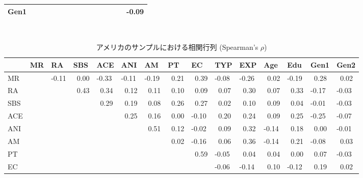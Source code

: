 \documentclass[a4j,12pt]{jreport}
\begin{document}
\begin{table}[H]
{\begin{threeparttable}
\begin{tabular}{@{}lllllllllllllll@{}}
Gen1 &    &       &            &            &            &            &            &            &       &            &            &            &            & -0.09       
\\ \bottomrule
\end{tabular}
  \begin{tablenotes}
      \small
      \item ~~
    \end{tablenotes}
  \end{threeparttable}
  }
\end{table}

\begin{table}[H]
{\scriptsize
  \begin{threeparttable}
\caption{アメリカのサンプルにおける相関行列 (Spearman's $\rho$) }
\label{tab:Table_Cor_US}
\begin{tabular}{@{}lllllllllllllll@{}}
\toprule
     & MR & RA    & SBS        & ACE        & ANI        & AM         & PT         & EC         & TYP        & EXP        & Age        & Edu        & Gen1       & Gen2       \\ \midrule
MR   &    & -0.11 & ~0.00 & -0.33      & -0.11      & -0.19      & ~0.21 & ~0.39 & -0.08      & -0.26      & ~0.02 & -0.19      & ~0.28 & ~0.02 \\
RA   &    &       & ~0.43 & ~0.34 & ~0.12 & ~0.11 & ~0.10 & ~0.09 & ~0.07 & ~0.30 & ~0.07 & ~0.33 & -0.17      & -0.03      \\
SBS  &    &       &            & ~0.29 & ~0.19 & ~0.08 & ~0.26 & ~0.27 & ~0.02 & ~0.10 & ~0.09 & ~0.04 & -0.01      & -0.03      \\
ACE  &    &       &            &            & ~0.25 & ~0.16 & ~0.00 & -0.10      & ~0.20 & ~0.24 & ~0.09 & ~0.25 & -0.25      & -0.07      \\
ANI  &    &       &            &            &            & ~0.51 & ~0.12 & -0.02      & ~0.09 & ~0.32 & -0.14      & ~0.18 & ~0.00 & -0.01      \\
AM   &    &       &            &            &            &            & ~0.02 & -0.16      & ~0.06 & ~0.36 & -0.14      & ~0.21 & -0.08      & ~0.03 \\
PT   &    &       &            &            &            &            &            & ~0.59 & -0.05      & ~0.04 & ~0.04 & ~0.00 & ~0.07 & -0.03      \\
EC   &    &       &            &            &            &            &            &            & -0.06      & -0.14      & ~0.10 & -0.12      & ~0.19 & ~0.02 \\

\end{tabular}
\end{threeparttable}}
\end{table}
\end{document}
